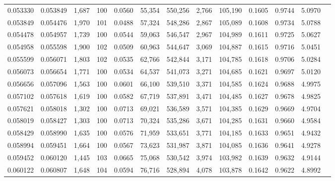 \begin{tabular}{rrrrrrrrrrrrr}
0.053330 & 0.053849 & 1,687 & 100 &                                     0.0560 &  55,354 & 550,256 &   2,766 & 105,190 & 0.1605 & 0.9744 & 5.0970 \\
0.053849 & 0.054476 & 1,970 & 101 &                                     0.0488 &  57,324 & 548,286 &   2,867 & 105,089 & 0.1608 & 0.9734 & 5.0788 \\
0.054478 & 0.054957 & 1,739 & 100 &                                     0.0544 &  59,063 & 546,547 &   2,967 & 104,989 & 0.1611 & 0.9725 & 5.0627 \\
0.054958 & 0.055598 & 1,900 & 102 &                                     0.0509 &  60,963 & 544,647 &   3,069 & 104,887 & 0.1615 & 0.9716 & 5.0451 \\
0.055599 & 0.056071 & 1,803 & 102 &                                     0.0535 &  62,766 & 542,844 &   3,171 & 104,785 & 0.1618 & 0.9706 & 5.0284 \\
0.056073 & 0.056654 & 1,771 & 100 &                                     0.0534 &  64,537 & 541,073 &   3,271 & 104,685 & 0.1621 & 0.9697 & 5.0120 \\
0.056656 & 0.057096 & 1,563 & 100 &                                     0.0601 &  66,100 & 539,510 &   3,371 & 104,585 & 0.1624 & 0.9688 & 4.9975 \\
0.057102 & 0.057618 & 1,619 & 100 &                                     0.0582 &  67,719 & 537,891 &   3,471 & 104,485 & 0.1627 & 0.9678 & 4.9825 \\
0.057621 & 0.058018 & 1,302 & 100 &                                     0.0713 &  69,021 & 536,589 &   3,571 & 104,385 & 0.1629 & 0.9669 & 4.9704 \\
0.058019 & 0.058427 & 1,303 & 100 &                                     0.0713 &  70,324 & 535,286 &   3,671 & 104,285 & 0.1631 & 0.9660 & 4.9584 \\
0.058429 & 0.058990 & 1,635 & 100 &                                     0.0576 &  71,959 & 533,651 &   3,771 & 104,185 & 0.1633 & 0.9651 & 4.9432 \\
0.058994 & 0.059451 & 1,664 & 100 &                                     0.0567 &  73,623 & 531,987 &   3,871 & 104,085 & 0.1636 & 0.9641 & 4.9278 \\
0.059452 & 0.060120 & 1,445 & 103 &                                     0.0665 &  75,068 & 530,542 &   3,974 & 103,982 & 0.1639 & 0.9632 & 4.9144 \\
0.060122 & 0.060807 & 1,648 & 104 &                                     0.0594 &  76,716 & 528,894 &   4,078 & 103,878 & 0.1642 & 0.9622 & 4.8992 \\

\end{tabular}
